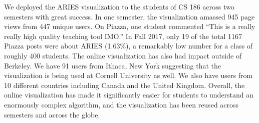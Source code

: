 \documentclass[12pt]{article}
\begin{document}
We deployed the ARIES visualization to the students of CS 186 across two
semesters with great success. In one semester, the visualization amassed 945
page views from 447 unique users. On Piazza, one student commented ``This is a
really really high quality teaching tool IMO.'' In Fall 2017, only 19 of the
total 1167 Piazza posts were about ARIES (1.63\%), a remarkably low number for
a class of roughly 400 students. The online visualization has also had impact
outside of Berkeley. We have 91 users from Ithaca, New York suggesting that the
visualization is being used at Cornell University as well. We also have users
from 10 different countries including Canada and the United Kingdom. Overall,
the online visualization has made it significantly easier for students to
understand an enormously complex algorithm, and the visualization has been
reused across semesters and across the globe.

{
  \footnotesize
  
  
}
\end{document}
